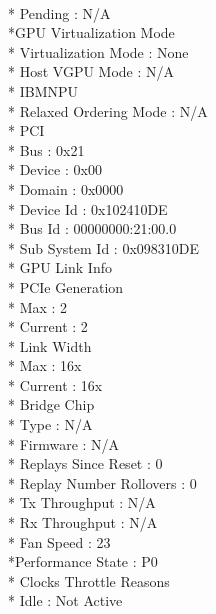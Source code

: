 \documentclass{article}
\begin{document}
        \\* Pending                           : N/A
     \\*GPU Virtualization Mode
        \\* Virtualization Mode               : None
        \\* Host VGPU Mode                    : N/A
    \\* IBMNPU
       \\*  Relaxed Ordering Mode             : N/A
    \\* PCI
     \\*    Bus                               : 0x21
    \\*     Device                            : 0x00
      \\*   Domain                            : 0x0000
       \\*  Device Id                         : 0x102410DE
      \\*   Bus Id                            : 00000000:21:00.0
     \\*    Sub System Id                     : 0x098310DE
      \\*   GPU Link Info
      \\*       PCIe Generation
      \\*           Max                       : 2
      \\*           Current                   : 2
        \\*     Link Width
         \\*        Max                       : 16x
        \\*         Current                   : 16x
        \\* Bridge Chip
       \\*      Type                          : N/A
       \\*      Firmware                      : N/A
      \\*   Replays Since Reset               : 0
       \\*  Replay Number Rollovers           : 0
      \\*   Tx Throughput                     : N/A
      \\*   Rx Throughput                     : N/A
    \\* Fan Speed                             : 23 %
     \\*Performance State                     : P0
    \\* Clocks Throttle Reasons
      \\*   Idle                              : Not Active
\end{document}
